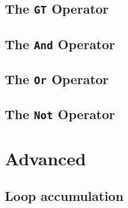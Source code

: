    \subsection{The \texttt{GT} Operator}
    
    \subsection{The \texttt{And} Operator}
    
    \subsection{The \texttt{Or} Operator}
    
    \subsection{The \texttt{Not} Operator}

\section{Advanced}
    \subsection{Loop accumulation}
